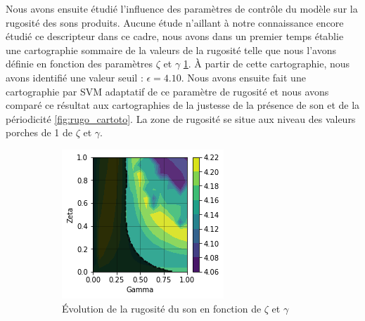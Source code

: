 \documentclass[french, twocolumn]{article}
\begin{document}
Nous avons ensuite étudié l'influence des paramètres de contrôle du modèle sur la rugosité des sons produits. Aucune étude n'aillant à notre connaissance encore étudié ce descripteur dans ce cadre, nous avons dans un premier temps établie une cartographie sommaire de la valeurs de la rugosité telle que nous l'avons définie en fonction des paramètres $\zeta$ et $\gamma$ \ref{subfig:Rugosité}. À partir de cette cartographie, nous avons identifié une valeur seuil : $\epsilon = 4.10$. Nous avons ensuite fait une cartographie par SVM adaptatif de ce paramètre de rugosité et nous avons comparé ce résultat aux cartographies de la justesse de la présence de son et de la périodicité \ref{fig:rugo_cartoto}. La zone de rugosité se situe aux niveau des valeurs porches de 1 de $\zeta$ et $\gamma$.  

\begin{figure}[h!]
    \centering
    \begin{subfigure}[b]{.49\linewidth}
        \includegraphics[width=\linewidth]{img/rugo_colormap.png}
        \caption{Évolution de la rugosité du son en fonction de $\zeta$ et $\gamma$}
        \label{subfig:Rugosité}
    \end{subfigure}
    \hfill
    \begin{subfigure}[b]{.49\linewidth}       

\end{subfigure}
\end{figure}
\end{document}
